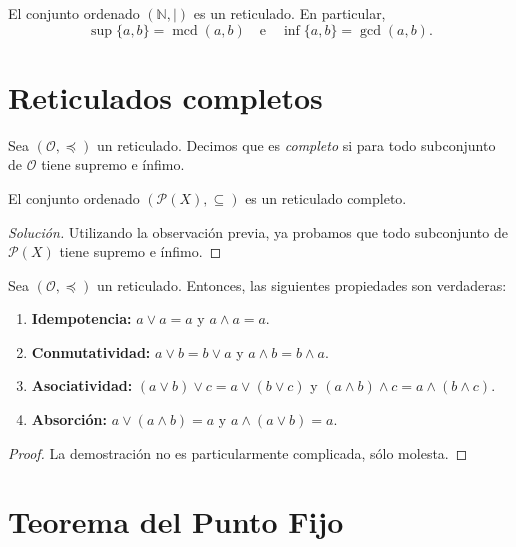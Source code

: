 \begin{example}
	El conjunto ordenado $(\mathbb{N},\mid)$ es un reticulado. En particular,
	\begin{equation*}
		\sup \{ a, b \} = \operatorname{mcd}( a, b ) \quad \text{e} \quad \inf \{ a, b \} = \operatorname{gcd}( a, b ).
	\end{equation*}
\end{example}

\section{Reticulados completos}

\begin{definition}
	Sea $(\mathcal{O}, \preceq)$ un reticulado. Decimos que es \emph{completo} si para todo subconjunto de $\mathcal{O}$ tiene supremo e ínfimo.
\end{definition}

\begin{example}
	El conjunto ordenado $(\mathcal{P}(X), \subseteq)$ es un reticulado completo.
\end{example}

\begin{proof}[Solución]
	Utilizando la observación previa, ya probamos que todo subconjunto de $\mathcal{P}(X)$ tiene supremo e ínfimo.
\end{proof}

\begin{proposition}
	Sea $(\mathcal{O}, \preceq)$ un reticulado. Entonces, las siguientes propiedades son verdaderas:
	\begin{enumerate}
		\item \textbf{Idempotencia:} $a \vee a = a$ y $a \wedge a = a$.
		\item \textbf{Conmutatividad:} $a \vee b = b \vee a$ y $a \wedge b = b \wedge a$.
		\item \textbf{Asociatividad:} $(a \vee b) \vee c = a \vee (b \vee c)$ y $(a \wedge b) \wedge c = a \wedge (b \wedge c)$.
		\item \textbf{Absorción:} $a \vee (a \wedge b) = a$ y $a \wedge (a \vee b) = a$.
	\end{enumerate}
\end{proposition}

\begin{proof}
	La demostración no es particularmente complicada, sólo molesta.
\end{proof}

\section{Teorema del Punto Fijo}

